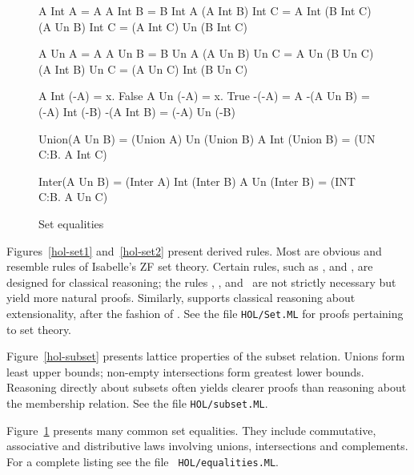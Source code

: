 \begin{figure} \underscoreon   \hfuzz=4pt%
\begin{ttbox}
        A Int A = A
       A Int B = B Int A
         (A Int B) Int C  =  A Int (B Int C)
    (A Un B)  Int C  =  (A Int C) Un (B Int C)

         A Un A = A
        A Un B = B Un A
          (A Un B)  Un C  =  A Un (B Un C)
    (A Int B) Un C  =  (A Un C) Int (B Un C)

    A Int (-A) = {\ttlbrace}x. False{\ttrbrace}
   A Un  (-A) = {\ttlbrace}x. True{\ttrbrace}
 -(-A) = A
          -(A Un B)  = (-A) Int (-B)
         -(A Int B) = (-A) Un (-B)

  Union(A Un B) = (Union A) Un (Union B)
         A Int (Union B) = (UN C:B. A Int C)

  Inter(A Un B) = (Inter A) Int (Inter B)
          A Un (Inter B) = (INT C:B. A Un C)

\end{ttbox}
\caption{Set equalities} \label{hol-equalities}
\end{figure}

Figures~\ref{hol-set1} and~\ref{hol-set2} present derived rules.  Most are
obvious and resemble rules of Isabelle's ZF set theory.  Certain rules, such
as ,  and , are designed for classical
reasoning; the rules , ,  and~ are
not strictly necessary but yield more natural proofs.  Similarly,
 supports classical reasoning about extensionality, after the
fashion of .  See the file \texttt{HOL/Set.ML} for proofs
pertaining to set theory.

Figure~\ref{hol-subset} presents lattice properties of the subset relation.
Unions form least upper bounds; non-empty intersections form greatest lower
bounds.  Reasoning directly about subsets often yields clearer proofs than
reasoning about the membership relation.  See the file \texttt{HOL/subset.ML}.

Figure~\ref{hol-equalities} presents many common set equalities.  They
include commutative, associative and distributive laws involving unions,
intersections and complements.  For a complete listing see the file {\tt
HOL/equalities.ML}.

